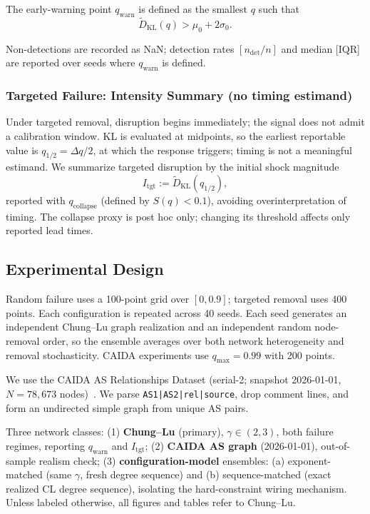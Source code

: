\documentclass{nws}
\newcommand{\CAIDASnapshot}{2026-01-01}
\begin{document}
The early-warning point $q_{\mathrm{warn}}$ is defined as the smallest $q$ such that
\[
\tilde{D}_{\mathrm{KL}}(q) > \mu_0 + 2\sigma_0.
\]

Non-detections are recorded as NaN; detection rates $[n_{\mathrm{det}}/n]$ and
median [IQR] are reported over seeds where $q_{\mathrm{warn}}$ is defined.

\subsubsection{Targeted Failure: Intensity Summary (no timing estimand)}
Under targeted removal, disruption begins immediately; the signal does not admit a
calibration window. KL is evaluated at midpoints, so the earliest reportable value is
$q_{1/2}=\Delta q/2$, at which the response triggers; timing is not a meaningful estimand.
We summarize targeted disruption by the initial shock magnitude
\[
I_{\mathrm{tgt}} := \tilde{D}_{\mathrm{KL}}(q_{1/2}),
\]
reported with $q_{\mathrm{collapse}}$ (defined by $S(q)<0.1$), avoiding
overinterpretation of timing. The collapse proxy is post hoc only; changing its threshold
affects only reported lead times.

\subsection{Experimental Design}
Random failure uses a 100-point grid over $[0,0.9]$; targeted removal uses 400 points.
Each configuration is repeated across 40 seeds. Each seed generates an independent Chung--Lu
graph realization and an independent random node-removal order, so the ensemble averages
over both network heterogeneity and removal stochasticity.
CAIDA experiments use $q_{\max}=0.99$ with 200 points.

We use the CAIDA AS Relationships Dataset (serial-2; snapshot
\CAIDASnapshot, $N=78{,}673$ nodes)~\citep{caida_as_rel_20260101}. We parse
\texttt{AS1|AS2|rel|source}, drop comment lines, and form an undirected simple graph from
unique AS pairs.

Three network classes: (1) \textbf{Chung--Lu} (primary), $\gamma \in (2,3)$, both
failure regimes, reporting $q_{\mathrm{warn}}$ and $I_{\mathrm{tgt}}$; (2)
\textbf{CAIDA AS graph} (\CAIDASnapshot), out-of-sample realism check; (3)
\textbf{configuration-model} ensembles: (a) exponent-matched (same $\gamma$, fresh degree
sequence) and (b) sequence-matched (exact realized CL degree sequence), isolating the
hard-constraint wiring mechanism. Unless labeled otherwise, all figures and tables refer
to Chung--Lu.
\end{document}
